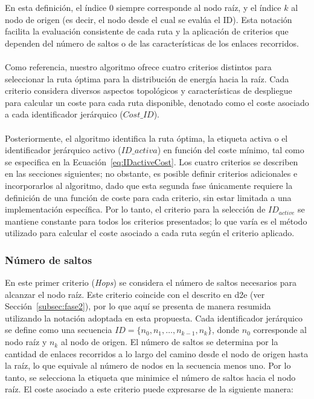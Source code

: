 En esta definición, el índice 0 siempre corresponde al nodo raíz, y el índice \( k \) al nodo de origen (es decir, el nodo desde el cual se evalúa el ID). Esta notación facilita la evaluación consistente de cada ruta y la aplicación de criterios que dependen del número de saltos o de las características de los enlaces recorridos.\\
\\
Como referencia, nuestro algoritmo ofrece cuatro criterios distintos para seleccionar la ruta óptima para la distribución de energía hacia la raíz. Cada criterio considera diversos aspectos topológicos y características de despliegue para calcular un coste para cada ruta disponible, denotado como el coste asociado a cada identificador jerárquico ($Cost\_{ID}$).\\
\\
Posteriormente, el algoritmo identifica la ruta óptima, la etiqueta activa o el identificador jerárquico activo ($ID\_{activa}$) en función del coste mínimo, tal como se especifica en la Ecuación~\ref{eq:IDactiveCost}. Los cuatro criterios se describen en las secciones siguientes; no obstante, es posible definir criterios adicionales e incorporarlos al algoritmo, dado que esta segunda fase únicamente requiere la definición de una función de coste para cada criterio, sin estar limitada a una implementación específica. Por lo tanto, el criterio para la selección de $ID_{active}$ se mantiene constante para todos los criterios presentados; lo que varía es el método utilizado para calcular el coste asociado a cada ruta según el criterio aplicado.

\subsubsection{Número de saltos}
\label{subsec:criteria_01}

En este primer criterio (\textit{Hops}) se considera el número de saltos necesarios para alcanzar el nodo raíz. Este criterio coincide con el descrito en \gls{d2e} (ver Sección~\ref{subsec:fase2}), por lo que aquí se presenta de manera resumida utilizando la notación adoptada en esta propuesta. Cada identificador jerárquico se define como una secuencia \( ID = \{n_0, n_{1}, \dots, n_{k-1}, n_k\} \), donde \( n_0 \) corresponde al nodo raíz y \( n_k \) al nodo de origen. El número de saltos se determina por la cantidad de enlaces recorridos a lo largo del camino desde el nodo de origen hasta la raíz, lo que equivale al número de nodos en la secuencia menos uno. Por lo tanto, se selecciona la etiqueta que minimice el número de saltos hacia el nodo raíz. El coste asociado a este criterio puede expresarse de la siguiente manera:

